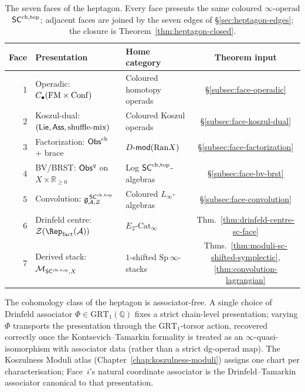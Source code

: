 \begin{table}[h]
\centering
\begin{tabular}{rllc}
\toprule
Face & Presentation & Home category & Theorem input \\
\midrule
1 & Operadic: $C_\bullet(\mathrm{FM}\times\mathrm{Conf})$ & Coloured homotopy operads
& \S\ref{subsec:face-operadic} \\
2 & Koszul-dual: $(\mathsf{Lie},\mathsf{Ass},\text{shuffle-mix})$ & Coloured Koszul
operads & \S\ref{subsec:face-koszul-dual} \\
3 & Factorization: $\mathsf{Obs}^{\mathrm{ch}}$ + brace & $D\text{-}\mathsf{mod}(\mathrm{Ran} X)$ &
\S\ref{subsec:face-factorization} \\
4 & BV/BRST: $\mathsf{Obs}^q$ on $X\times\mathbb{R}_{\geq 0}$ &
Log $\mathsf{SC}^{\mathrm{ch},\mathrm{top}}$-algebras & \S\ref{subsec:face-bv-brst} \\
5 & Convolution: $\mathfrak{g}^{\,\mathsf{SC}^{\mathrm{ch},\mathrm{top}}}_{\mathcal{A},Z}$ & Coloured
$L_\infty$-algebras & \S\ref{subsec:face-convolution} \\
6 & Drinfeld centre: $\cZ(\Rep_{\mathrm{fact}}(\cA))$ &
$E_2$-$\mathrm{Cat}_\infty$ &
Thm.~\ref{thm:drinfeld-centre-sc-face} \\
7 & Derived stack: $\mathcal{M}_{\mathsf{SC}^{\mathrm{ch},\mathrm{top}},X}$ & $1$-shifted
$\mathrm{Sp}\,\infty$-stacks &
Thms.~\ref{thm:moduli-sc-shifted-symplectic},
\ref{thm:convolution-lagrangian} \\
\bottomrule
\end{tabular}
\caption{The seven faces of the heptagon. Every face presents the
same coloured $\infty$-operad $\mathsf{SC}^{\mathrm{ch},\mathrm{top}}$; adjacent faces are joined
by the seven edges of \S\ref{sec:heptagon-edges}; the closure is
Theorem~\ref{thm:heptagon-closed}.}
\label{tab:heptagon-faces}
\end{table}

\begin{remark}\label{rem:heptagon-assoc-free}
The cohomology class of the heptagon is associator-free. A single
choice of Drinfeld associator $\Phi\in\mathrm{GRT}_1(\mathbb{Q})$
fixes a strict chain-level presentation; varying $\Phi$ transports
the presentation through the $\mathrm{GRT}_1$-torsor action,
recovered correctly once the Kontsevich--Tamarkin
formality is treated as an $\infty$-quasi-isomorphism with
associator data (rather than a strict dg-operad map). The
Koszulness Moduli atlas
(Chapter~\ref{chap:koszulness-moduli}) assigns one chart per
characterisation; Face~$i$'s natural coordinate associator is the
Drinfeld--Tamarkin associator canonical to that presentation.
\end{remark}

